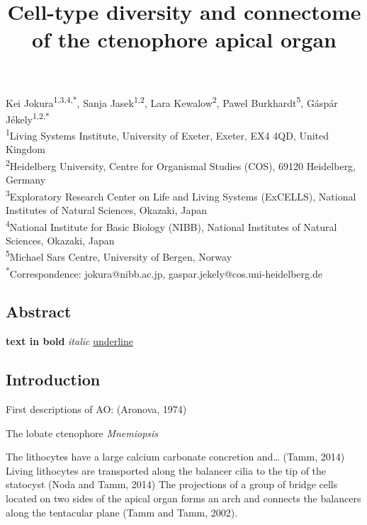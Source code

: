 \documentclass[
  11pt,
]{article}
\title{Cell-type diversity and connectome of the ctenophore apical
organ}
\author{}
\date{}
\begin{document}
\maketitle

\linenumbers


\hfill\break

Kei Jokura\textsuperscript{1,3,4,*}, Sanja Jasek\textsuperscript{1,2},
Lara Kewalow\textsuperscript{2}, Pawel Burkhardt\textsuperscript{5},
Gáspár Jékely\textsuperscript{1,2,*}\\

\textsuperscript{1}Living Systems Institute, University of Exeter,
Exeter, EX4 4QD, United Kingdom\\
\textsuperscript{2}Heidelberg University, Centre for Organismal Studies
(COS), 69120 Heidelberg, Germany\\
\textsuperscript{3}Exploratory Research Center on Life and Living
Systems (ExCELLS), National Institutes of Natural Sciences, Okazaki,
Japan\\
\textsuperscript{4}National Institute for Basic Biology (NIBB), National
Institutes of Natural Sciences, Okazaki, Japan\\
\textsuperscript{5}Michael Sars Centre, University of Bergen, Norway\\
\textsuperscript{*}Correspondence: jokura@nibb.ac.jp,
gaspar.jekely@cos.uni-heidelberg.de

\subsection{Abstract}\label{abstract}

\textbf{text in bold} \emph{italic} \ul{underline}

\subsection{Introduction}\label{introduction}

First descriptions of AO: (Aronova, 1974)

The lobate ctenophore \emph{Mnemiopsis}

The lithocytes have a large calcium carbonate concretion and\ldots{}
(Tamm, 2014) Living lithocytes are transported along the balancer cilia
to the tip of the statocyst (Noda and Tamm, 2014) The projections of a
group of bridge cells located on two sides of the apical organ forms an
arch and connects the balancers along the tentacular plane (Tamm and
Tamm, 2002).
\end{document}

